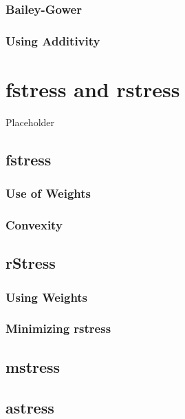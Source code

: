 \documentclass[
  12pt,
]{book}
\begin{document}
\subsection{Bailey-Gower}\label{bailey-gower}

\subsection{Using Additivity}\label{using-additivity}

\chapter{fstress and rstress}\label{chrstress}

Placeholder

\section{fstress}\label{fstress}

\subsection{Use of Weights}\label{use-of-weights}

\subsection{Convexity}\label{convexity}

\section{rStress}\label{rstress}

\subsection{Using Weights}\label{using-weights}

\subsection{Minimizing rstress}\label{minimizing-rstress}

\section{mstress}\label{mstress}

\section{astress}\label{astress}
\end{document}
